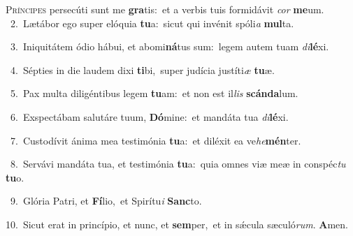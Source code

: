 \lettrine{\initial\textcolor{\initialcolor}{P}}{ríncipes} persecúti sunt me \textbf{gra}\-tis:~\star et a verbis tuis formidávit \textit{cor} \textbf{me}\-um.\\
{\numbfont\textcolor{\numbcolor}{~2.}}~Lætábor ego super elóquia \textbf{tu}\-a:~\star sicut qui invénit spóli\textit{a} \textbf{mul}\-ta.\par
{\numbfont\textcolor{\numbcolor}{~3.}}~Iniquitátem ódio hábui, et abomi\-\textbf{ná}\-tus sum:~\star legem autem tuam \textit{di}\-\textbf{lé}xi.\par
{\numbfont\textcolor{\numbcolor}{~4.}}~Sépties in die laudem dixi \textbf{ti}\-bi,~\star super judícia justíti\textit{æ} \textbf{tu}\-æ.\par
{\numbfont\textcolor{\numbcolor}{~5.}}~Pax multa diligéntibus legem \textbf{tu}\-am:~\star et non est il\textit{lis} \textbf{scán}\-\textbf{da}lum.\par
{\numbfont\textcolor{\numbcolor}{~6.}}~Exspectábam salutáre tuum, \textbf{Dó}\-mine:~\star et mandáta tua \textit{di}\-\textbf{lé}xi.\par
{\numbfont\textcolor{\numbcolor}{~7.}}~Custodívit ánima mea testimónia \textbf{tu}\-a:~\star et diléxit ea ve\-\textit{he}\-\textbf{mén}ter.\par
{\numbfont\textcolor{\numbcolor}{~8.}}~Servávi mandáta tua, et testimónia \textbf{tu}\-a:~\star quia omnes viæ meæ in conspéc\textit{tu} \textbf{tu}\-o.\par
{\numbfont\textcolor{\numbcolor}{~9.}}~Glória Patri, et \textbf{Fí}\-lio,~\star et Spirítu\textit{i} \textbf{Sanc}\-to.\par
{\numbfont\textcolor{\numbcolor}{10.}}~Sicut erat in princípio, et nunc, et \textbf{sem}\-per,~\star et in sǽcula sæculó\-\textit{rum}\-. \textbf{A}\-men.\par
